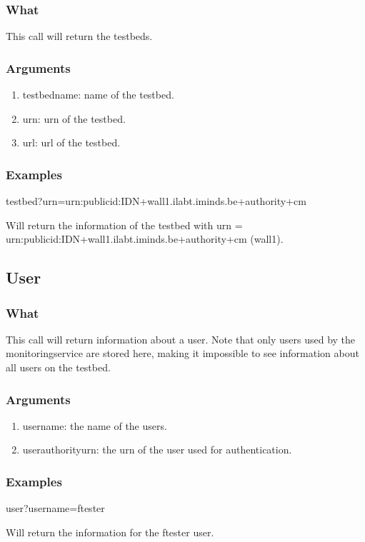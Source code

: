 \begin{otherlanguage}{english}
\subsubsection{What}
This call will return the testbeds.
\subsubsection{Arguments}
\begin{enumerate}
\item testbedname: name of the testbed.
\item urn: urn of the testbed.
\item url: url of the testbed.
\end{enumerate}
\subsubsection{Examples}
\begin{lt}
testbed?urn=urn:publicid:IDN+wall1.ilabt.iminds.be+authority+cm
\end{lt}
Will return the information of the testbed with urn = \\
urn:publicid:IDN+wall1.ilabt.iminds.be+authority+cm (wall1).
\\
\subsection{User}
\subsubsection{What}
This call will return information about a user. Note that only users used by the monitoringservice are stored here, making it impossible to see information about all users on the testbed.
\subsubsection{Arguments}
\begin{enumerate}
\item username: the name of the users.
\item userauthorityurn: the urn of the user used for authentication.
\end{enumerate}
\subsubsection{Examples}
\begin{lt}
user?username=ftester
\end{lt}
Will return the information for the ftester user.
\\

\end{otherlanguage}
